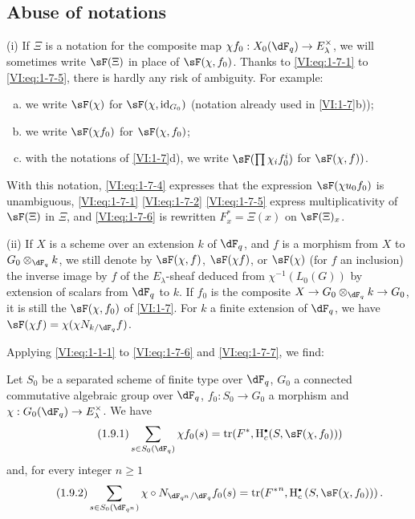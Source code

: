\subsection{Abuse of notations}\label{VI:1-8}

(i) If $\Xi$ is a notation for the composite map
$\chi f_0:X_0(\dF_q) \to E_\lambda^\times$, we will sometimes write $\sF(\Xi)$ in
place of $\sF(\chi,f_0)$. Thanks to \eqref{VI:eq:1-7-1} to \eqref{VI:eq:1-7-5},
there is hardly any risk of ambiguity. For example:
\begin{enumerate}[a)]
  \item we write $\sF(\chi)$ for $\sF(\chi,\operatorname{id}_{G_0})$
    (notation already used in \ref{VI:1-7}b));
  \item we write $\sF(\chi f_0)$ for $\sF(\chi,f_0)$;
  \item with the notations of \ref{VI:1-7}d), we write
    $\sF(\prod \chi_i f_0^i)$ for $\sF(\chi,f))$.
\end{enumerate}

With this notation, \eqref{VI:eq:1-7-4} expresses that the expression
$\sF(\chi u_0 f_0)$ is unambiguous, \eqref{VI:eq:1-7-1} \eqref{VI:eq:1-7-2}
\eqref{VI:eq:1-7-5} express multiplicativity of $\sF(\Xi)$ in $\Xi$,
and \eqref{VI:eq:1-7-6} is rewritten $F_x^\ast = \Xi(x)$ on $\sF(\Xi)_x$.

(ii) If $X$ is a scheme over an extension $k$ of $\dF_q$, and $f$ is a
morphism from $X$ to $G_0\otimes_{\dF_q} k$, we still denote by $\sF(\chi,f)$,
$\sF(\chi f)$, or $\sF(\chi)$ (for $f$ an inclusion) the inverse image by
$f$ of the $E_\lambda$-sheaf deduced from $\chi^{-1}(L_0(G))$ by extension of
scalars from $\dF_q$ to $k$. If $f_0$ is the composite
$X\to G_0\otimes_{\dF_q} k \to G_0$, it is still the $\sF(\chi,f_0)$ of
\ref{VI:1-7}. For $k$ a finite extension of $\dF_q$, we have
$\sF(\chi f) = \chi(\chi N_{k/\dF_q} f)$.

Applying \eqref{VI:eq:1-1-1} to \eqref{VI:eq:1-7-6} and \eqref{VI:eq:1-7-7},
we find: 





\begin{theorem_}\label{VI:1-9}
Let $S_0$ be a separated scheme of finite type over $\dF_q$, $G_0$ a connected
commutative algebraic group over $\dF_q$, $f_0:S_0\to G_0$ a morphism and
$\chi:G_0(\dF_q) \to E_\lambda^\times$. We have 
\begin{equation*}\tag{1.9.1}\label{VI:eq:1-9-1}
  \sum_{s\in S_0(\dF_q)} \chi f_0(s) = \tr(F^\ast,\h_c^\bullet(S,\sF(\chi,f_0))) 
\end{equation*}
and, for every integer $n\geqslant 1$
\begin{equation*}\tag{1.9.2}\label{VI:eq:1-9-2}
  \sum_{s\in S_0(\dF_{q^n})} \chi\circ N_{\dF_{q^n}/\dF_q} f_0(s) = \tr({F^\ast}^n, \h_c^\bullet\left(S,\sF(\chi,f_0))\right) \text{.}
\end{equation*}
\end{theorem_}





